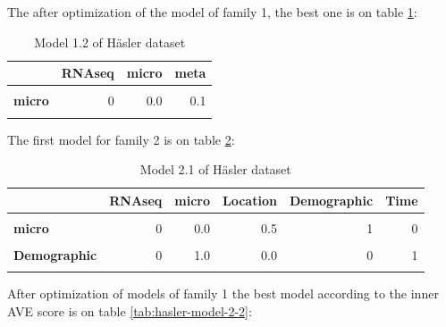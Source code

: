 \documentclass[
  a4paper,
]{book}
\begin{document}
The after optimization of the model of family 1, the best one is on table \ref{tab:hasler-model-1-2}:

\begin{table}[H]

\caption[Model 1.2 of Häsler dataset]{\label{tab:hasler-model-1-2}Model 1.2 of Häsler dataset}
\centering
\begin{tabular}[t]{>{}l||r|r|r}
\hline
  & RNAseq & micro & meta\\
\hline
\textbf{\cellcolor{gray!6}{RNAseq}} & \cellcolor{gray!6}{0} & \cellcolor{gray!6}{0.0} & \cellcolor{gray!6}{1.0}\\
\hline
\textbf{micro} & 0 & 0.0 & 0.1\\
\hline
\textbf{\cellcolor{gray!6}{meta}} & \cellcolor{gray!6}{1} & \cellcolor{gray!6}{0.1} & \cellcolor{gray!6}{0.0}\\
\hline
\end{tabular}
\end{table}

The first model for family 2 is on table \ref{tab:hasler-model-2-1}:

\begin{table}[H]

\caption[Model 2.1 of Häsler dataset]{\label{tab:hasler-model-2-1}Model 2.1 of Häsler dataset}
\centering
\begin{tabular}[t]{>{}l||r|r|r|r|r}
\hline
  & RNAseq & micro & Location & Demographic & Time\\
\hline
\textbf{\cellcolor{gray!6}{RNAseq}} & \cellcolor{gray!6}{0} & \cellcolor{gray!6}{0.0} & \cellcolor{gray!6}{1.0} & \cellcolor{gray!6}{0} & \cellcolor{gray!6}{0}\\
\hline
\textbf{micro} & 0 & 0.0 & 0.5 & 1 & 0\\
\hline
\textbf{\cellcolor{gray!6}{Location}} & \cellcolor{gray!6}{1} & \cellcolor{gray!6}{0.5} & \cellcolor{gray!6}{0.0} & \cellcolor{gray!6}{0} & \cellcolor{gray!6}{0}\\
\hline
\textbf{Demographic} & 0 & 1.0 & 0.0 & 0 & 1\\
\hline
\textbf{\cellcolor{gray!6}{Time}} & \cellcolor{gray!6}{0} & \cellcolor{gray!6}{0.0} & \cellcolor{gray!6}{0.0} & \cellcolor{gray!6}{1} & \cellcolor{gray!6}{0}\\
\hline
\end{tabular}
\end{table}

After optimization of models of family 1 the best model according to the inner AVE score is on table \ref{tab:hasler-model-2-2}:
\end{document}
